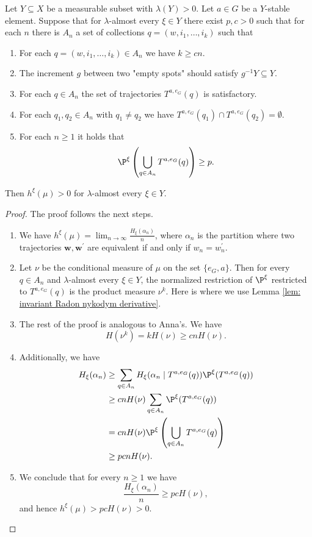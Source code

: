 \begin{thm} Let $Y\subseteq X$ be a measurable subset with $\lambda(Y)>0$. Let $a\in G$ be a $Y$-stable element. Suppose that for $\lambda$-almost every $\xi \in Y$ there exist $p,c>0$ such that for each $n$ there is $A_n$ a set of collections $q=(w,i_1,\ldots, i_k)$ such that
	\begin{enumerate}
		\item For each $q=(w,i_1,\ldots, i_k)\in A_n$ we have $k\ge cn$.
		\item {} The increment $g$ between two "empty spots" should satisfy $g^{-1}Y\subseteq Y$.
		\item For each $q\in A_n$ the set of trajectories $T^{a,e_G}(q)$ is satisfactory.
		\item For each $q_1,q_2\in A_n$ with $q_1\neq q_2$ we have $T^{a,e_G}(q_1)\cap T^{a,e_G}(q_2)= \emptyset$.
		\item For each $n\ge 1$ it holds that
		\[
		\P^{\xi}\left(\bigcup_{q\in A_n}T^{a,e_G}(q)\right)\ge p.
		\]
	\end{enumerate}
	Then $h^{\xi}(\mu)>0$ for $\lambda$-almost every $\xi \in Y$.
\end{thm}
\begin{proof}
	The proof follows the next steps.
	\begin{enumerate}
	\item We have $h^{\xi}(\mu)=\lim_{n\to \infty} \frac{H_{\xi}(\alpha_n)}{n}$, where $\alpha_n$ is the partition where two trajectories $\mathbf{w}, \mathbf{w}^{\prime}$ are equivalent if and only if $w_n=w^{\prime}_n$.
	\item Let $\nu$ be the conditional measure of $\mu$ on the set $\{e_G,a\}$. Then for every $q\in A_n$ and $\lambda$-almost every $\xi\in Y$, the normalized restriction of $\P^{\xi}$ restricted to $T^{a,e_G}(q)$ is the product measure $\nu^k$. Here is where we use Lemma \ref{lem: invariant Radon nykodym derivative}.
	\item The rest of the proof is analogous to Anna's. We have
	$$
	H(\nu^k)=kH(\nu)\ge cnH(\nu).
	$$
	\item Additionally, we have
	\begin{align*}
		H_{\xi}(\alpha_n)&\ge \sum_{q\in A_n}H_{\xi}(\alpha_n\mid T^{a,e_G}(q))\P^{\xi}(T^{a,e_G}(q))\\
		&\ge  cnH(\nu)\sum_{q\in A_n}\P^{\xi}(T^{a,e_G}(q))\\
		&=cnH(\nu)\P^{\xi}\left(\bigcup_{q\in A_n}T^{a,e_G}(q)\right)\\
		&\ge pcnH(\nu).
	\end{align*}
\item We conclude that for every $n\ge 1$ we have
$$
\frac{H_{\xi}(\alpha_n)}{n}\ge pcH(\nu),
$$
and hence $h^{\xi}(\mu)>pcH(\nu)>0$.

	\end{enumerate}
	
\end{proof}
